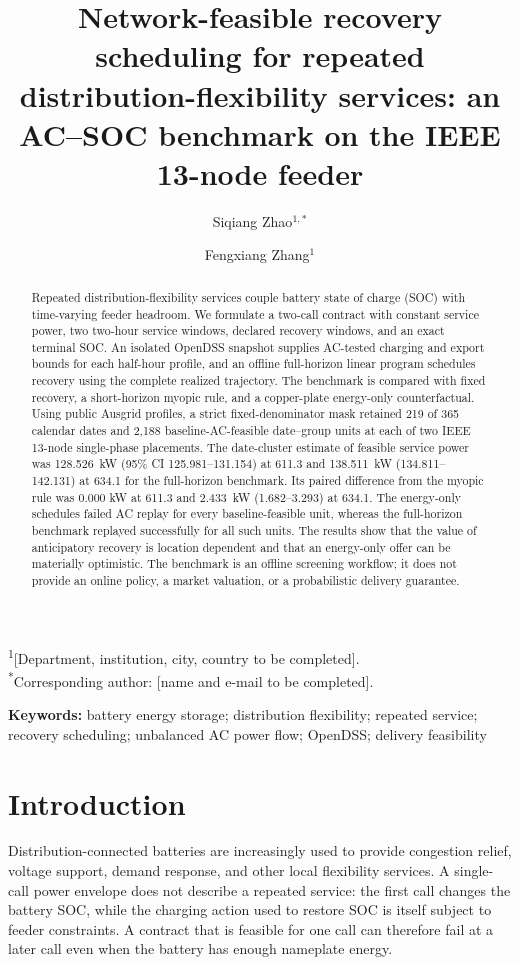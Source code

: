 \documentclass[11pt]{article}
\title{Network-feasible recovery scheduling for repeated distribution-flexibility services: an AC--SOC benchmark on the IEEE 13-node feeder}
\author{Siqiang Zhao$^{1,*}$ \and Fengxiang Zhang$^{1}$}
\date{}
\newcommand{\kw}[1]{#1~kW}
\begin{document}
\maketitle

\noindent\textsuperscript{1}[Department, institution, city, country to be completed].\\
\textsuperscript{*}Corresponding author: [name and e-mail to be completed].

\begin{abstract}
Repeated distribution-flexibility services couple battery state of charge (SOC) with time-varying feeder headroom. We formulate a two-call contract with constant service power, two two-hour service windows, declared recovery windows, and an exact terminal SOC. An isolated OpenDSS snapshot supplies AC-tested charging and export bounds for each half-hour profile, and an offline full-horizon linear program schedules recovery using the complete realized trajectory. The benchmark is compared with fixed recovery, a short-horizon myopic rule, and a copper-plate energy-only counterfactual. Using public Ausgrid profiles, a strict fixed-denominator mask retained 219 of 365 calendar dates and 2,188 baseline-AC-feasible date--group units at each of two IEEE 13-node single-phase placements. The date-cluster estimate of feasible service power was \kw{128.526} (95\% CI 125.981--131.154) at 611.3 and \kw{138.511} (134.811--142.131) at 634.1 for the full-horizon benchmark. Its paired difference from the myopic rule was 0.000 kW at 611.3 and \kw{2.433} (1.682--3.293) at 634.1. The energy-only schedules failed AC replay for every baseline-feasible unit, whereas the full-horizon benchmark replayed successfully for all such units. The results show that the value of anticipatory recovery is location dependent and that an energy-only offer can be materially optimistic. The benchmark is an offline screening workflow; it does not provide an online policy, a market valuation, or a probabilistic delivery guarantee.
\end{abstract}

\noindent\textbf{Keywords:} battery energy storage; distribution flexibility; repeated service; recovery scheduling; unbalanced AC power flow; OpenDSS; delivery feasibility

\section{Introduction}
Distribution-connected batteries are increasingly used to provide congestion relief, voltage support, demand response, and other local flexibility services. A single-call power envelope does not describe a repeated service: the first call changes the battery SOC, while the charging action used to restore SOC is itself subject to feeder constraints. A contract that is feasible for one call can therefore fail at a later call even when the battery has enough nameplate energy.
\end{document}
